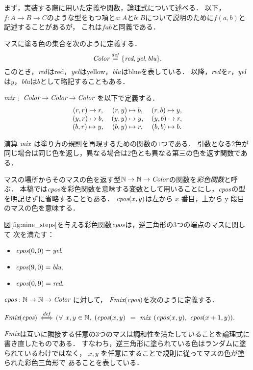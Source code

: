 まず，実装する際に用いた定義や関数，論理式について述べる．
以下，$f:A\to B\to C$のような型をもつ項と$a:A$と$b:B$について説明のために$f(a,b)$と記述することがあるが，
これは$f a b$と同義である．
\begin{dfn}[$\Color$]\rm
  マスに塗る色の集合を次のように定義する．
  \[
  \textit{Color} \overset{{\it def}}{=} \{\textit{red}, \textit{yel}, \textit{blu}\}.
  \]
  このとき，$\textit{red}$は{\rm{red}}，$\textit{yel}$は{\rm{yellow}}，$\textit{blu}$は{\rm{blue}}を表している．
  以降，$\textit{red}$を$r$，$\textit{yel}$は$y$，$\textit{blu}$は$b$として略記することもある．
\end{dfn}
\begin{dfn}[$\mix$]\rm
  $\mix$ $:$ $\textit{Color} \to \textit{Color} \to \textit{Color}$ を以下で定義する．
  \[
  \begin{tabular}{ccccc}
    $(r,r) \Pto r,$ & $(r,y) \Pto b,$ & $(r,b) \Pto y,$ \\
    $(y,r) \Pto b,$ & $(y,y) \Pto y,$ & $(y,b) \Pto r,$ \\
    $(b,r) \Pto y,$ & $(b,y) \Pto r,$ & $(b,b) \Pto b.$ \\
  \end{tabular}
  \]
\end{dfn}
演算 $\mix$ は塗り方の規則を再現するための関数の$1$つである．
引数となる$2$色が同じ場合は同じ色を返し，異なる場合は$2$色とも異なる第三の色を返す関数である．
\begin{dfn}[彩色関数]\rm
  マスの場所からそのマスの色を返す型$\mathbb{N} \to \mathbb{N} \to \textit{Color}$の関数を{\em 彩色関数}と呼ぶ．
  本稿では$\textit{cpos}$を彩色関数を意味する変数として用いることにし，$\textit{cpos}$の型を明記せずに省略することもある．
  $\textit{cpos}(x,y)$は左から $x$ 番目，上から y 段目のマスの色を意味する．
\end{dfn}
\begin{exm}
  図$\ref{fig:nine_steps}$を与える彩色関数$\textit{cpos}$は，逆三角形の$3$つの端点のマスに関して
  次を満たす：
  \begin{itemize}
    \item $\textit{cpos}(0,0) = \textit{yel},$
    \item $\textit{cpos}(9,0) = \textit{blu},$
    \item $\textit{cpos}(0,9) = \textit{red}.$
  \end{itemize}
\end{exm}
\begin{dfn}[$\Fmix$]\rm
  $\textit{cpos} : \mathbb{N} \to \mathbb{N} \to \textit{Color}$ に対して，
  $\textit{Fmix}(\textit{cpos})$を次のように定義する．

  $\textit{Fmix}(\textit{cpos})$ $\overset{{\it def}}{\Longleftrightarrow}$
  $(\forall$ $x,y \in\mathbb{N},$
  $(\textit{cpos}(x,y)$ $=$ $\mix$ $(\textit{cpos}(x,y),$ $\textit{cpos}(x+1,y)).$
\end{dfn}
$\Fmix$は互いに隣接する任意の$3$つのマスは調和性を満たしていることを論理式に書き直したものである．
すなわち，逆三角形に塗られている色はランダムに塗られているわけではなく，
$x,y$ を任意にすることで規則に従ってマスの色が塗られた彩色三角形で
あることを表している．

